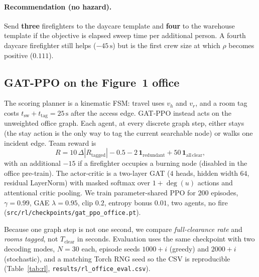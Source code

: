 \documentclass[12pt]{article}
\newcommand{\Tclear}{T_{\mathrm{clear}}}
\newcommand{\tsw}{t_{\mathrm{sw}}}
\newcommand{\ttag}{t_{\mathrm{tag}}}
\newcommand{\whall}{v_{h}}
\newcommand{\vroom}{v_{r}}
\begin{document}
\paragraph{Recommendation (no hazard).}
Send \textbf{three} firefighters to the daycare template and \textbf{four} to the
warehouse template if the objective is elapsed sweep time per additional person.
A fourth daycare firefighter still helps (\(-45\,\mathrm{s}\)) but is the first
crew size at which \(\rho\) becomes positive (\(0.111\)).

\subsection{GAT-PPO on the Figure~1 office}
\label{sec:gat-ppo}

The scoring planner is a kinematic FSM: travel uses \(\whall\) and \(\vroom\),
and a room tag costs \(\tsw+\ttag=25\,\mathrm{s}\) after the access edge.
GAT-PPO instead acts on the unweighted office graph. Each agent, at every
discrete graph step, either stays (the stay action is the only way to tag the
current searchable node) or walks one incident edge. Team reward is
\begin{equation}
  \label{eq:rl-reward}
  R
  = 10\,\Delta |R_{\mathrm{tagged}}|
    -0.5
    -2\,\mathbf{1}_{\mathrm{redundant}}
    +50\,\mathbf{1}_{\mathrm{all\,clear}},
\end{equation}
with an additional \(-15\) if a firefighter occupies a burning node (disabled in
the office pre-train). The actor-critic is a two-layer GAT (\(4\) heads,
hidden width \(64\), residual LayerNorm) with masked softmax over
\(1+\deg(u)\) actions and attentional critic pooling. We train parameter-shared
PPO for \(200\) episodes, \(\gamma=0.99\), GAE \(\lambda=0.95\), clip \(0.2\),
entropy bonus \(0.01\), two agents, no fire
(\texttt{src/rl/checkpoints/gat\_ppo\_office.pt}).

Because one graph step is not one second, we compare \emph{full-clearance rate}
and \emph{rooms tagged}, not \(\Tclear\) in seconds. Evaluation uses the same
checkpoint with two decoding modes, \(N=30\) each, episode seeds \(1000{+}i\)
(greedy) and \(2000{+}i\) (stochastic), and a matching Torch RNG seed so the
CSV is reproducible (Table~\ref{tab:rl},
\texttt{results/rl\_office\_eval.csv}).
\end{document}
